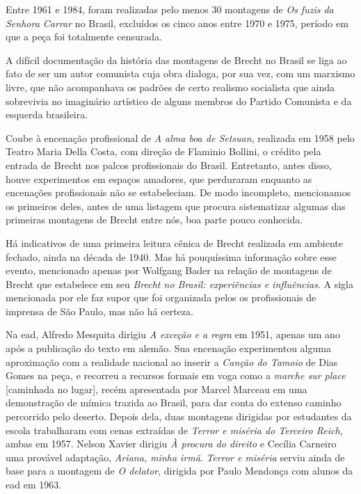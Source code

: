 Entre 1961 e 1984, foram realizadas pelo menos 30 montagens de {\it Os
fuzis da Senhora Carrar} no Brasil, excluídos os cinco anos entre 1970 e
1975, período em que a peça foi totalmente censurada.

\subject{Brecht dos amadores}

A difícil documentação da história das montagens de Brecht no Brasil se
liga ao fato de ser um autor comunista cuja obra dialoga, por sua vez,
com um marxismo livre, que não acompanhava os padrões de certo realismo
socialista que ainda sobrevivia no imaginário artístico de alguns
membros do Partido Comunista e da esquerda brasileira.

Coube à encenação profissional de {\it A alma boa de Setsuan}, realizada
em 1958 pelo Teatro Maria Della Costa, com direção de Flaminio Bollini,
o crédito pela entrada de Brecht nos palcos profissionais do Brasil.
Entretanto, antes disso, houve experimentos em espaços amadores, que
perduraram enquanto as encenações profissionais não se estabeleciam. De
modo incompleto, mencionamos os primeiros deles, antes de uma listagem
que procura sistematizar algumas das primeiras montagens de Brecht entre
nós, boa parte pouco conhecida.

Há indicativos de uma primeira leitura cênica de Brecht realizada em
ambiente fechado, ainda na década de 1940. Mas há pouquíssima informação
sobre esse evento, mencionado apenas por Wolfgang Bader na relação de
montagens de Brecht que estabelece em seu {\it Brecht no Brasil:
experiências e influências}. A sigla mencionada por ele faz supor que
foi organizada pelos os profissionais de imprensa de São Paulo, mas não
há certeza.

Na {\sc ead}, Alfredo Mesquita dirigiu {\it A exceção e a regra} em 1951,
apenas um ano após a publicação do texto em alemão. Sua encenação
experimentou alguma aproximação com a realidade nacional ao inserir a
{\it Canção do Tamoio} de Dias Gomes na peça, e recorreu a recursos
formais em voga como a {\it marche sur place} {[}caminhada no lugar{]},
recém apresentada por Marcel Marceau em uma demonstração de mímica
trazida ao Brasil, para dar conta do extenso caminho percorrido pelo
deserto. Depois dela, duas montagens dirigidas por estudantes da escola
trabalharam com cenas extraídas de {\it Terror e miséria do Terceiro
Reich}, ambas em 1957. Nelson Xavier dirigiu {\it À procura do direito}
e Cecília Carneiro uma provável adaptação, {\it Ariana, minha irmã}.
{\it Terror e miséria} serviu ainda de base para a montagem de {\it O
delator}, dirigida por Paulo Mendonça com alunos da {\sc ead} em 1963.

